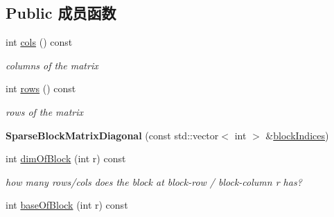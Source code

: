 \subsection*{Public 成员函数}
\begin{DoxyCompactItemize}
\item 
\hypertarget{classg2o_1_1SparseBlockMatrixDiagonal_ad732f51a1553530d5645c24861975207}{int \hyperlink{classg2o_1_1SparseBlockMatrixDiagonal_ad732f51a1553530d5645c24861975207}{cols} () const }\label{classg2o_1_1SparseBlockMatrixDiagonal_ad732f51a1553530d5645c24861975207}

\begin{DoxyCompactList}\small\item\em columns of the matrix \end{DoxyCompactList}\item 
\hypertarget{classg2o_1_1SparseBlockMatrixDiagonal_aa255d0a5069a9ad0ca6674a4e70c8397}{int \hyperlink{classg2o_1_1SparseBlockMatrixDiagonal_aa255d0a5069a9ad0ca6674a4e70c8397}{rows} () const }\label{classg2o_1_1SparseBlockMatrixDiagonal_aa255d0a5069a9ad0ca6674a4e70c8397}

\begin{DoxyCompactList}\small\item\em rows of the matrix \end{DoxyCompactList}\item 
\hypertarget{classg2o_1_1SparseBlockMatrixDiagonal_a0e01566c4ff881af058f366672291b27}{{\bfseries Sparse\-Block\-Matrix\-Diagonal} (const std\-::vector$<$ int $>$ \&\hyperlink{classg2o_1_1SparseBlockMatrixDiagonal_acac6778f21aea2355fccad48de1c6f08}{block\-Indices})}\label{classg2o_1_1SparseBlockMatrixDiagonal_a0e01566c4ff881af058f366672291b27}

\item 
\hypertarget{classg2o_1_1SparseBlockMatrixDiagonal_a80f1f9af0e97734b92f6c26054e8b316}{int \hyperlink{classg2o_1_1SparseBlockMatrixDiagonal_a80f1f9af0e97734b92f6c26054e8b316}{dim\-Of\-Block} (int r) const }\label{classg2o_1_1SparseBlockMatrixDiagonal_a80f1f9af0e97734b92f6c26054e8b316}

\begin{DoxyCompactList}\small\item\em how many rows/cols does the block at block-\/row / block-\/column r has? \end{DoxyCompactList}\item 
\hypertarget{classg2o_1_1SparseBlockMatrixDiagonal_a282013b87fc71fa5ef6657ea4f58855d}{int \hyperlink{classg2o_1_1SparseBlockMatrixDiagonal_a282013b87fc71fa5ef6657ea4f58855d}{base\-Of\-Block} (int r) const }\label{classg2o_1_1SparseBlockMatrixDiagonal_a282013b87fc71fa5ef6657ea4f58855d}


\end{DoxyCompactItemize}
